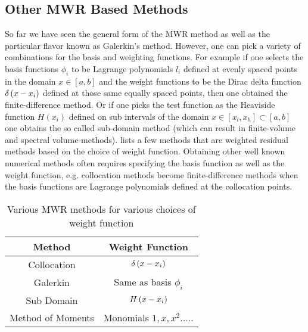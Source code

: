 \subsection{Other MWR Based Methods}
So far we have seen the general form of the MWR method as well as the particular flavor known as Galerkin's method.  However, one can pick a variety of combinations for the basis and weighting functions.  For example if one selects the basis functions $\phi_{i}$ to be Lagrange polynomials $l_{i}$ defined at evenly spaced points in the domain $x \in [a,b]$ and  the weight functions to be the Dirac delta function $\delta\left( x-x_{i} \right)$ defined at those same equally spaced points, then one obtained the finite-difference method.  Or if one picks the test function as the Heaviside function $H(x_{i})$ defined on sub intervals of the domain $x \in [x_{l},x_{h}] \subset [a,b]$ one obtains the so called sub-domain method (which can result in finite-volume and spectral volume-methods).   lists a few methods that are weighted residual methods based on the choice of weight function.   Obtaining other well known numerical methods often requires specifying the basis function as well as the weight function, e.g. collocation methods become finite-difference methods when the basis functions are Lagrange polynomials defined at the collocation points.   

\begin{table}[h!]
\caption{Various MWR methods for various choices of weight function}
\label{tbl:c2_mwr}
\center 
\begin{tabular}{|c|c|}
\hline  
Method & Weight Function \\
\hline 
Collocation & $\delta \left( x - x_{i} \right) $ \\
Galerkin & Same as basis $\phi_{i}$ \\ 
Sub Domain & $H \left( x - x_{i} \right)$ \\
Method of Moments & Monomials $1,x,x^{2}.....$ \\
\hline 
\end{tabular}
\end{table}

